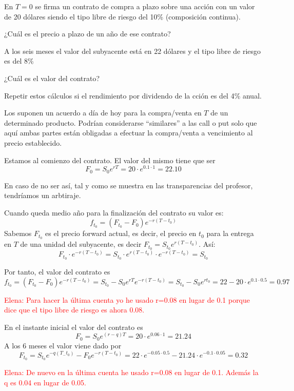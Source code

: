 \begin{problem}[1]
En $T=0$ se firma un contrato de compra a plazo sobre una acción con un valor de 20 dólares siendo el tipo libre de riesgo del 10\% (composición continua).

\ppart ¿Cuál es el precio a plazo de un año de ese contrato?

A los seis meses el valor del subyacente está en 22 dólares y el tipo libre de riesgo es del 8\%

\ppart ¿Cuál es el valor del contrato?

\ppart Repetir estos cálculos si el rendimiento por dividendo de la cción es del 4\% anual.

\solution
{}

Los  suponen un acuerdo a día de hoy para la compra/venta en $T$ de un determinado producto. Podrían considerarse ``similares'' a las call o put solo que aquí ambas partes están obligadas a efectuar la compra/venta a vencimiento al precio establecido.

\spart
Estamos al comienzo del contrato. El valor del mismo tiene que ser
\[F_0 = S_0e^{rT} = 20 \cdot e^{0.1\cdot 1} = 22.10\]

En caso de no ser así, tal y como se muestra en las transparencias del profesor, tendríamos un arbtiraje.

\spart Cuando queda medio año para la finalización del contrato su valor es:
\[f_{t_0} = (F_{t_0}-F_0)e^{-r(T-t_0)}\]
Sabemos $F_{t_0}$ es el precio forward actual, es decir, el precio en $t_0$ para la entrega en $T$ de una unidad del subyacente, es decir $F_{t_0} = S_{t_0}e^{r(T-t_0)}$. Así:
\[F_{t_0} \cdot e^{-r(T-t_0)} = S_{t_0}\cdot e^{r(T-t_0)}  \cdot e^{-r(T-t_0)} =S_{t_0}\]

Por tanto, el valor del contrato es
\[f_{t_0} = (F_{t_0}-F_0)e^{-r(T-t_0)} = S_{t_0}-S_0e^{rT}e^{-r(T-t_0)} = S_{t_0}-S_0e^{rt_0} = 22 - 20\cdot e^{0.1\cdot 0.5} = 0.97 \]

\textcolor{red}{Elena: Para hacer la última cuenta yo he usado r=0.08 en lugar de 0.1 porque dice que el tipo libre de riesgo es ahora 0.08.}

\spart
En el instante inicial el valor del contrato es
\[F_0 = S_0e^{(r-q)T} = 20 \cdot e^{0.06\cdot 1} = 21.24\]
A los 6 meses el valor viene dado por
\[F_{t_0} = S_{t_0}e^{-q(T_-t_0)}-F_0e^{-r(T-t_0)} = 22\cdot e^{-0.05\cdot 0.5} - 21.24\cdot e^{-0.1\cdot 0.05} = 0.32\]

\textcolor{red}{Elena: De nuevo en la última cuenta he usado r=0.08 en lugar de 0.1. Además la q es 0.04 en lugar de 0.05.}

\end{problem}

